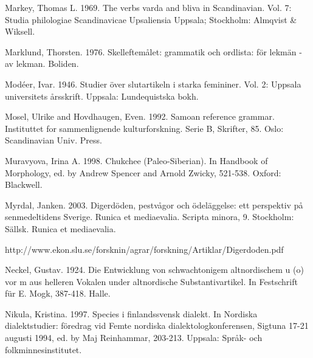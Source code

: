 Markey, Thomas L. 1969. The verbs varda and bliva in Scandinavian. Vol. 7: Studia philologiae Scandinavicae Upsaliensia Uppsala; Stockholm: Almqvist \& Wiksell.


Marklund, Thorsten. 1976. Skelleftemålet: grammatik och ordlista: för lekmän - av lekman. Boliden.


Modéer, Ivar. 1946. Studier över slutartikeln i starka femininer. Vol. 2: Uppsala universitets årsskrift. Uppsala: Lundequistska bokh.


Mosel, Ulrike and Hovdhaugen, Even. 1992. Samoan reference grammar. Instituttet for sammenlignende kulturforskning. Serie B, Skrifter, 85. Oslo: Scandinavian Univ. Press.


Muravyova, Irina A. 1998. Chukchee (Paleo-Siberian). In Handbook of Morphology, ed. by Andrew Spencer and Arnold Zwicky, 521-538. Oxford: Blackwell.


Myrdal, Janken. 2003. Digerdöden, pestvågor och ödeläggelse: ett perspektiv på senmedeltidens Sverige. Runica et mediaevalia. Scripta minora, 9. Stockholm: Sällsk. Runica et mediaevalia. 


http://www.ekon.slu.se/forsknin/agrar/forskning/Artiklar/Digerdoden.pdf 


Neckel, Gustav. 1924. Die Entwicklung von schwachtonigem altnordischem u (o) vor m aus helleren Vokalen under altnordische Substantivartikel. In Festschrift für E. Mogk, 387-418. Halle.


Nikula, Kristina. 1997. Species i finlandssvensk dialekt. In Nordiska dialektstudier: föredrag vid Femte nordiska dialektologkonferensen, Sigtuna 17-21 augusti 1994, ed. by Maj Reinhammar, 203-213. Uppsala: Språk- och folkminnesinstitutet.


